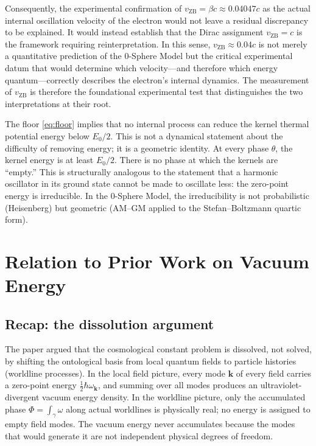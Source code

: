 \documentclass[%
 reprint, amsmath,amssymb, aps, prb, ]{revtex4-2}
\numberwithin{equation}{section}
\begin{document}
Consequently, the experimental confirmation of $v_\text{ZB} = \beta c \approx 0.04047c$ as the actual internal oscillation velocity of the electron would not leave a residual discrepancy to be explained. It would instead establish that the Dirac assignment $v_\text{ZB} = c$ is the framework requiring reinterpretation. In this sense, $v_\text{ZB} \approx 0.04c$ is not merely a quantitative prediction of the 0-Sphere Model but the critical experimental datum that would determine which velocity---and therefore which energy quantum---correctly describes the electron's internal dynamics. The measurement of $v_\text{ZB}$ is therefore the foundational experimental test that distinguishes the two interpretations at their root.

The floor \eqref{eq:floor} implies that no internal process can reduce the kernel thermal potential energy below $E_0/2$. This is not a dynamical statement about the difficulty of removing energy; it is a geometric identity. At every phase $\theta$, the kernel energy is at least $E_0/2$. There is no phase at which the kernels are ``empty.'' This is structurally analogous to the statement that a harmonic oscillator in its ground state cannot be made to oscillate less: the zero-point energy is irreducible. In the 0-Sphere Model, the irreducibility is not probabilistic (Heisenberg) but geometric (AM--GM applied to the Stefan--Boltzmann quartic form).

\section{Relation to Prior Work on Vacuum Energy}
\label{sec:vacuum}

\subsection{Recap: the dissolution argument}

The paper \cite{hanamura2026_32} argued that the cosmological constant problem is dissolved, not solved, by shifting the ontological basis from local quantum fields to particle histories (worldline processes). In the local field picture, every mode $\mathbf{k}$ of every field carries a zero-point energy $\tfrac{1}{2}\hbar\omega_\mathbf{k}$, and summing over all modes produces an ultraviolet-divergent vacuum energy density. In the worldline picture, only the accumulated phase $\Phi = \int_\gamma \omega$ along actual worldlines is physically real; no energy is assigned to empty field modes. The vacuum energy never accumulates because the modes that would generate it are not independent physical degrees of freedom.
\end{document}
